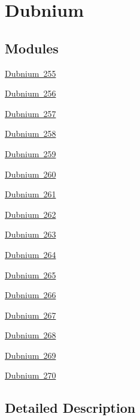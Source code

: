 \hypertarget{group___isotope_const-_dubnium}{}\section{Dubnium}
\label{group___isotope_const-_dubnium}
\subsection*{Modules}
\begin{DoxyCompactItemize}
\item 
\mbox{\hyperlink{group___isotope_const-_dubnium-_db255}{Dubnium 255}}
\item 
\mbox{\hyperlink{group___isotope_const-_dubnium-_db256}{Dubnium 256}}
\item 
\mbox{\hyperlink{group___isotope_const-_dubnium-_db257}{Dubnium 257}}
\item 
\mbox{\hyperlink{group___isotope_const-_dubnium-_db258}{Dubnium 258}}
\item 
\mbox{\hyperlink{group___isotope_const-_dubnium-_db259}{Dubnium 259}}
\item 
\mbox{\hyperlink{group___isotope_const-_dubnium-_db260}{Dubnium 260}}
\item 
\mbox{\hyperlink{group___isotope_const-_dubnium-_db261}{Dubnium 261}}
\item 
\mbox{\hyperlink{group___isotope_const-_dubnium-_db262}{Dubnium 262}}
\item 
\mbox{\hyperlink{group___isotope_const-_dubnium-_db263}{Dubnium 263}}
\item 
\mbox{\hyperlink{group___isotope_const-_dubnium-_db264}{Dubnium 264}}
\item 
\mbox{\hyperlink{group___isotope_const-_dubnium-_db265}{Dubnium 265}}
\item 
\mbox{\hyperlink{group___isotope_const-_dubnium-_db266}{Dubnium 266}}
\item 
\mbox{\hyperlink{group___isotope_const-_dubnium-_db267}{Dubnium 267}}
\item 
\mbox{\hyperlink{group___isotope_const-_dubnium-_db268}{Dubnium 268}}
\item 
\mbox{\hyperlink{group___isotope_const-_dubnium-_db269}{Dubnium 269}}
\item 
\mbox{\hyperlink{group___isotope_const-_dubnium-_db270}{Dubnium 270}}
\end{DoxyCompactItemize}


\subsection{Detailed Description}
